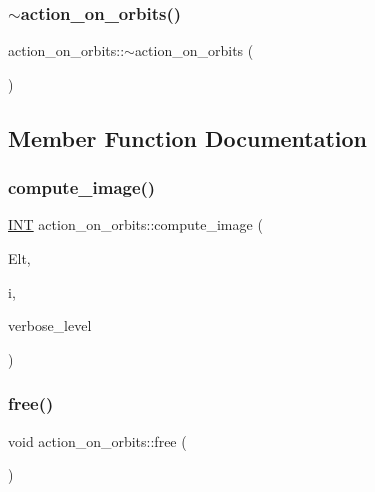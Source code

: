 \subsubsection{\texorpdfstring{$\sim$action\+\_\+on\+\_\+orbits()}{~action\_on\_orbits()}}
{\footnotesize\ttfamily action\+\_\+on\+\_\+orbits\+::$\sim$action\+\_\+on\+\_\+orbits (\begin{DoxyParamCaption}{ }\end{DoxyParamCaption})}



\subsection{Member Function Documentation}
\mbox{\label{classaction__on__orbits_ae32159cdaf30612c7e47de4593b32342}} 
\subsubsection{\texorpdfstring{compute\+\_\+image()}{compute\_image()}}
{\footnotesize\ttfamily \mbox{\hyperlink{galois_8h_a09fddde158a3a20bd2dcadb609de11dc}{I\+NT}} action\+\_\+on\+\_\+orbits\+::compute\+\_\+image (\begin{DoxyParamCaption}\item[{\mbox{\hyperlink{galois_8h_a09fddde158a3a20bd2dcadb609de11dc}{I\+NT}} $\ast$}]{Elt,  }\item[{\mbox{\hyperlink{galois_8h_a09fddde158a3a20bd2dcadb609de11dc}{I\+NT}}}]{i,  }\item[{\mbox{\hyperlink{galois_8h_a09fddde158a3a20bd2dcadb609de11dc}{I\+NT}}}]{verbose\+\_\+level }\end{DoxyParamCaption})}

\mbox{\label{classaction__on__orbits_a2c481e0fc48bbd6e3c0d7dd4c16f44e2}} 
\subsubsection{\texorpdfstring{free()}{free()}}
{\footnotesize\ttfamily void action\+\_\+on\+\_\+orbits\+::free (\begin{DoxyParamCaption}{ }\end{DoxyParamCaption})}

